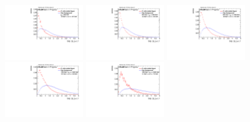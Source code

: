 \begin{figure}
\bigskip
\includegraphics[width=0.3\textwidth]{sascha_input/Appendix/Distributions/higgs/distributions/beta17/h_assisted_tj_D2_17_bin1.pdf} \hspace{1mm}
\includegraphics[width=0.3\textwidth]{sascha_input/Appendix/Distributions/higgs/distributions/beta17/h_assisted_tj_D2_17_bin2.pdf} \hspace{4mm}
\includegraphics[width=0.3\textwidth]{sascha_input/Appendix/Distributions/higgs/distributions/beta17/h_assisted_tj_D2_17_bin3.pdf} 
\bigskip
\includegraphics[width=0.3\textwidth]{sascha_input/Appendix/Distributions/higgs/distributions/beta17/h_assisted_tj_D2_17_bin4.pdf} \hspace{4mm}
\includegraphics[width=0.3\textwidth]{sascha_input/Appendix/Distributions/higgs/distributions/beta17/h_assisted_tj_D2_17_bin5.pdf} 


\end{figure}
